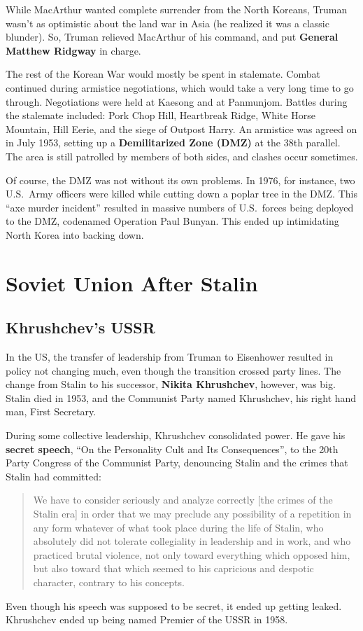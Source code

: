 While MacArthur wanted complete surrender from the North Koreans,
Truman wasn't as optimistic about the land war in Asia (he realized it was a classic blunder).
So, Truman relieved MacArthur of his command, and put \textbf{General Matthew Ridgway} in charge.

The rest of the Korean War would mostly be spent in stalemate.
Combat continued during armistice negotiations, which would take a very long time to go through.
Negotiations were held at Kaesong and at Panmunjom.
Battles during the stalemate included:
Pork Chop Hill,
Heartbreak Ridge,
White Horse Mountain,
Hill Eerie,
and the siege of Outpost Harry.
An armistice was agreed on in July 1953, setting up a \textbf{Demilitarized Zone (DMZ)} at the 38th parallel.
The area is still patrolled by members of both sides, and clashes occur sometimes.

Of course, the DMZ was not without its own problems.
In 1976, for instance, two U.S.\ Army officers were killed while cutting down a poplar tree in the DMZ\@.
This ``axe murder incident'' resulted in massive numbers of U.S.\ forces being deployed to the DMZ,
codenamed Operation Paul Bunyan.
This ended up intimidating North Korea into backing down.

\section{Soviet Union After Stalin}

\subsection*{Khrushchev's USSR}

In the US, the transfer of leadership from Truman to Eisenhower resulted in policy not changing much,
even though the transition crossed party lines.
The change from Stalin to his successor, \textbf{Nikita Khrushchev}, however, was big.
Stalin died in 1953, and the Communist Party named Khrushchev, his right hand man, First Secretary.

During some collective leadership, Khrushchev consolidated power.
He gave his \textbf{secret speech}, ``On the Personality Cult and Its Consequences'',
to the 20th Party Congress of the Communist Party,
denouncing Stalin and the crimes that Stalin had committed:
\begin{quote}
  We have to consider seriously and analyze correctly [the crimes of the Stalin era]
  in order that we may preclude any possibility of a repetition in any form whatever
  of what took place during the life of Stalin,
  who absolutely did not tolerate collegiality in leadership and in work,
  and who practiced brutal violence, not only toward everything which opposed him,
  but also toward that which seemed to his capricious and despotic character, contrary to his concepts.
\end{quote}
Even though his speech was supposed to be secret, it ended up getting leaked.
Khrushchev ended up being named Premier of the USSR in 1958.

